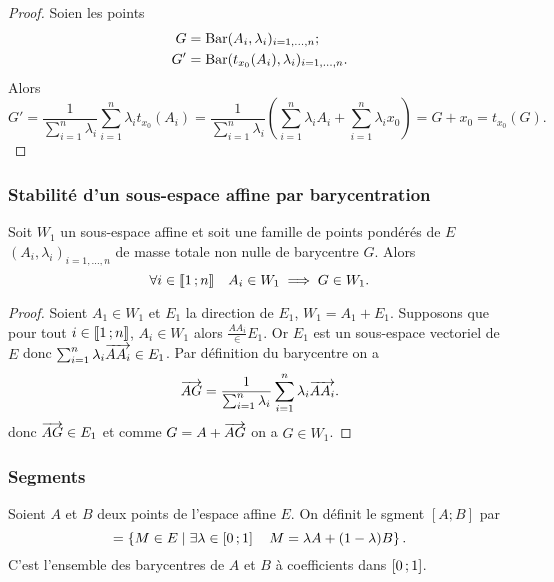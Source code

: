 \begin{proof}
  Soien les points
  \begin{align}
    G &= \operatorname{Bar}(A_i,\lambda_i)_{i=1,\ldots, n}; \\
    G' &=\operatorname{Bar}(t_{x_0}(A_i), \lambda_i)_{i=1, \ldots, n}.
  \end{align}
  Alors
  \begin{equation}
    G' = \frac{1}{\sum_{i=1}^n \lambda_i}{\sum_{i=1}^n \lambda_i t_{x_0}(A_i)} = \frac{1}{\sum_{i=1}^n \lambda_i} \left(\sum_{i=1}^n \lambda_i A_i + \sum_{i=1}^n \lambda_i x_0 \right) = G+x_0 = t_{x_0}(G).
\end{equation}
\end{proof}

\subsubsection{Stabilité d'un sous-espace affine par barycentration}

\begin{prop}
  Soit \(W_1\) un sous-espace affine et soit une famille de points pondérés de \(E\) \((A_i,\lambda_i)_{i=1, \ldots, n}\) de masse totale non nulle de barycentre \(G\). Alors
  \begin{equation}
    \forall i \in \mathopen{\llbracket}1\mathclose{}\mathpunct{};n\mathclose{\rrbracket} \quad A_i \in W_1 \implies G \in W_1.
  \end{equation}
\end{prop}
\begin{proof}
  Soient \(A_1 \in W_1\) et \(E_1\) la direction de \(E_1\), \(W_1=A_1+E_1\). Supposons que pour tout \(i \in \mathopen{\llbracket}1\mathclose{}\mathpunct{};n\mathclose{\rrbracket}\), \(A_i \in W_1\) alors \(\frac{AA_i} \in E_1\). Or \(E_1\) est un sous-espace vectoriel de \(E\) donc \(\sum_{i=1}^n \lambda_i \overrightarrow{AA_i} \in E_1\). Par définition du barycentre on a
  \begin{equation}
    \overrightarrow{AG}=\frac{1}{\sum_{i=1}^n \lambda_i}\sum_{i=1}^n \lambda_i \overrightarrow{AA_i}.
  \end{equation}
  donc \(\overrightarrow{AG} \in E_1\) et comme \(G=A+\overrightarrow{AG}\) on a \(G \in W_1\).
\end{proof}

\subsubsection{Segments}

\begin{defdef}
  Soient \(A\) et \(B\) deux points de l'espace affine \(E\). On définit le sgment \([A;B]\) par
  \begin{equation}
    [A;B] = \enstq{M \in E}{\exists \lambda \in \intervalleff{0}{1} \quad  M = \lambda A+(1-\lambda)B}.
  \end{equation}
  C'est l'ensemble des barycentres de \(A\) et \(B\) à coefficients dans \(\left[ 0 \, ;  1 \right]\).
\end{defdef}

